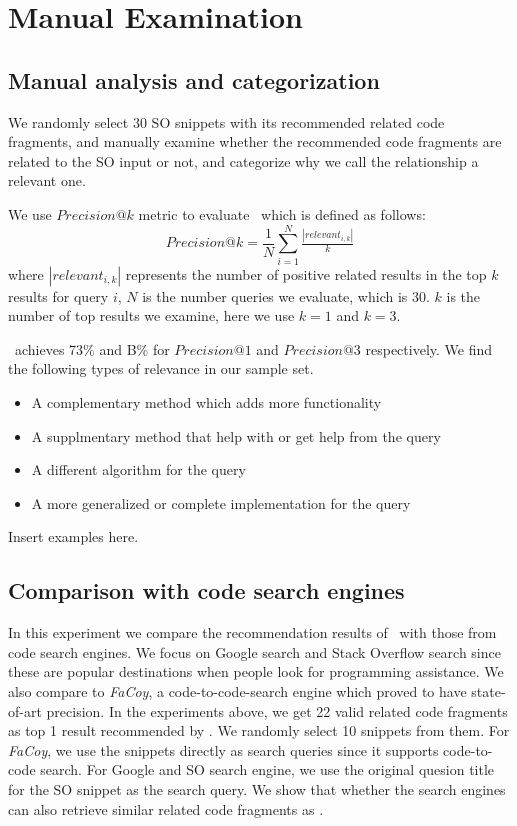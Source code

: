 \section{Manual Examination}
\label{sec:manual}

\subsection{Manual analysis and categorization}
We randomly select 30 SO snippets with its recommended related code fragments, and manually examine whether the recommended code fragments are related to the SO input or not, and categorize why we call the relationship a relevant one.

We use $Precision@k$ metric to evaluate \tool\  which is defined as follows:
\begin{equation}
Precision@k = \frac{1}{N}\sum_{i=1}^{N}\tfrac{\left | relevant_{i,k} \right |}{k}
\end{equation}
where $\left | relevant_{i,k} \right |$ represents the number of positive related results in the top $k$ results for query $i$, $N$ is the number queries we evaluate, which is $30$. $k$ is the number of top results we examine, here we use $k=1$ and $k=3$.

\tool\ achieves 73\% and B\% for $Precision@1$ and $Precision@3$ respectively.
We find the following types of relevance in our sample set.
\begin{itemize}
	\item A complementary method which adds more functionality
	\item A supplmentary method that help with or get help from the query
	\item A different algorithm for the query 
	\item A more generalized or complete implementation for the query	
\end{itemize}

Insert examples here.

\subsection{Comparison with code search engines}
In this experiment we compare the recommendation results of \tool\ with those from code search engines. We focus on Google search and Stack Overflow search since these are popular destinations when people look for programming assistance. We also compare to \textit{FaCoy}, a code-to-code-search engine which proved to have state-of-art precision. In the experiments above, we get 22 valid related code fragments as top 1 result recommended by \tool. We randomly select 10 snippets from them. For \textit{FaCoy}, we use the snippets directly as search queries since it supports code-to-code search. For Google and SO search engine, we use the original quesion title for the SO snippet as the search query. We show that whether the search engines can also retrieve similar related code fragments as \tool. 

